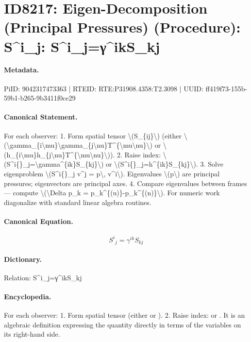 \section*{ID8217: Eigen-Decomposition (Principal Pressures) (Procedure): S\textasciicircum{}i\_j: S\textasciicircum{}i\_j=γ\textasciicircum{}ikS\_kj}
\paragraph{Metadata.}
PiID: 9042317473363 | RTEID: RTE:P31908.4358:T2.3098 | UUID: ff419f73-155b-59b1-b265-9b3411f0ce29

\paragraph{Canonical Statement.}
For each observer: 1. Form spatial tensor \textbackslash{}(S\_\{ij\}\textbackslash{}) (either \textbackslash{}(\textbackslash{}gamma\_\{i\textbackslash{}mu\}\textbackslash{}gamma\_\{j\textbackslash{}nu\}T\textasciicircum{}\{\textbackslash{}mu\textbackslash{}nu\}\textbackslash{}) or \textbackslash{}(h\_\{i\textbackslash{}mu\}h\_\{j\textbackslash{}nu\}T\textasciicircum{}\{\textbackslash{}mu\textbackslash{}nu\}\textbackslash{})). 2. Raise index: \textbackslash{}(S\textasciicircum{}i\{\}\_j=\textbackslash{}gamma\textasciicircum{}\{ik\}S\_\{kj\}\textbackslash{}) or \textbackslash{}(S\textasciicircum{}i\{\}\_j=h\textasciicircum{}\{ik\}S\_\{kj\}\textbackslash{}). 3. Solve eigenproblem \textbackslash{}(S\textasciicircum{}i\{\}\_j v\textasciicircum{}j = p\textbackslash{}, v\textasciicircum{}i\textbackslash{}). Eigenvalues \textbackslash{}(p\textbackslash{}) are principal pressures; eigenvectors are principal axes. 4. Compare eigenvalues between frames — compute \textbackslash{}(\textbackslash{}Delta p\_k = p\_k\textasciicircum{}\{(u)\}-p\_k\textasciicircum{}\{(n)\}\textbackslash{}). For numeric work diagonalize with standard linear algebra routines.

\paragraph{Canonical Equation.}
\[
S^i{}_j=\gamma^{ik}S_{kj}
\]

\paragraph{Dictionary.}
Relation: S\textasciicircum{}i\_j=γ\textasciicircum{}ikS\_kj

\paragraph{Encyclopedia.}
For each observer: 1. Form spatial tensor (either or ). 2. Raise index: or . It is an algebraic definition expressing the quantity directly in terms of the variables on its right-hand side.
